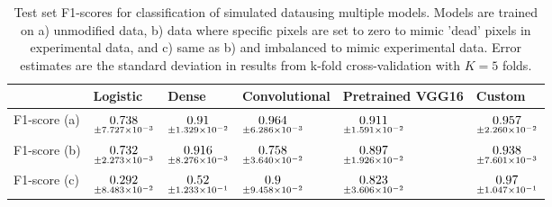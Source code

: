 \begin{table}
\centering
\caption{
Test set F1-scores for classification of simulated datausing multiple models.
Models are trained on a) unmodified data, b) data where specific pixels are set to zero to mimic
'dead' pixels in experimental data, and c) same as b) and imbalanced to mimic experimental data. 
Error estimates are the standard deviation in results from k-fold cross-validation with $K=5$ folds.
}
\label{tab:classification-simulated-all-f1-auc}
\begin{tabular}{llllll}
\toprule
{} &                                            Logistic &                                               Dense &                                       Convolutional &                                    Pretrained VGG16 &                                              Custom \\
\midrule
F1-score (a) &  $\underset{\num{+- 7.727e-03 }  }{\num{ 0.738 } }$ &  $\underset{\num{+- 1.329e-02 }  }{\num{ 0.91 } }$ &  $\underset{\num{+- 6.286e-03 }  }{\num{ 0.964 } }$ &  $\underset{\num{+- 1.591e-02 }  }{\num{ 0.911 } }$ &  $\underset{\num{+- 2.260e-02 }  }{\num{ 0.957 } }$ \\
F1-score (b) &  $\underset{\num{+- 2.273e-03 }  }{\num{ 0.732 } }$ &  $\underset{\num{+- 8.276e-03 }  }{\num{ 0.916 } }$ &  $\underset{\num{+- 3.640e-02 }  }{\num{ 0.758 } }$ &  $\underset{\num{+- 1.926e-02 }  }{\num{ 0.897 } }$ &  $\underset{\num{+- 7.601e-03 }  }{\num{ 0.938 } }$ \\
F1-score (c) &  $\underset{\num{+- 8.483e-02 }  }{\num{ 0.292 } }$ &  $\underset{\num{+- 1.233e-01 }  }{\num{ 0.52 } }$ &  $\underset{\num{+- 9.458e-02 }  }{\num{ 0.9 } }$ &  $\underset{\num{+- 3.606e-02 }  }{\num{ 0.823 } }$ &  $\underset{\num{+- 1.047e-01 }  }{\num{ 0.97 } }$ \\
\bottomrule
\end{tabular}
\end{table}
